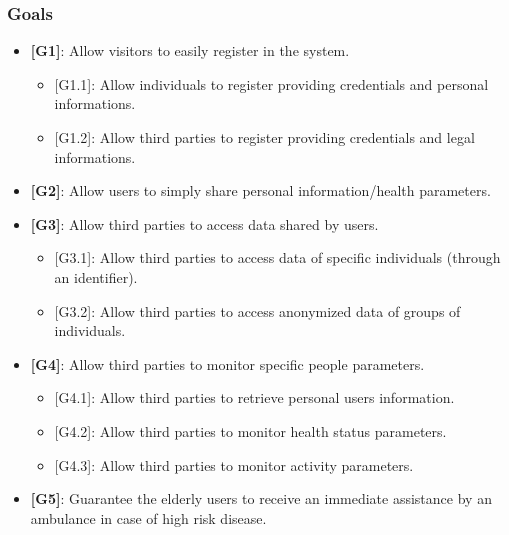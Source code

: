 \documentclass[12pt,a4paper]{article}
\begin{document}
		\subsubsection{Goals}
		\begin{itemize}
			\item {\textbf[}\textbf{G1}{\textbf]}: Allow visitors to easily register in the system.
				\begin{itemize}
					\item {[G1.1]}: Allow individuals to register providing credentials and personal informations.
					\item {[G1.2]}: Allow third parties to register providing credentials and legal informations.
				\end{itemize}
			\item {\textbf[}\textbf{G2}{\textbf]}: Allow users to simply share personal information/health parameters.
			\item {\textbf[}\textbf{G3}{\textbf]}: Allow third parties to access data shared by users.
				\begin{itemize}
					\item {[G3.1]}: Allow third parties to access data of specific individuals (through an identifier).
					\item {[G3.2]}: Allow third parties to access anonymized data of groups of individuals.
				\end{itemize}
			\item {\textbf[}\textbf{G4}{\textbf]}: Allow third parties to monitor specific people parameters.
				\begin{itemize}
					\item {[G4.1]}: Allow third parties to retrieve personal users information.
					\item {[G4.2]}: Allow third parties to monitor health status parameters.
					\item {[G4.3]}: Allow third parties to monitor activity parameters.
				\end{itemize}
			\item {\textbf[}\textbf{G5}{\textbf]}: Guarantee the elderly users to receive an immediate assistance by an ambulance in case of high risk disease.
		\end{itemize}
	
\end{document}
